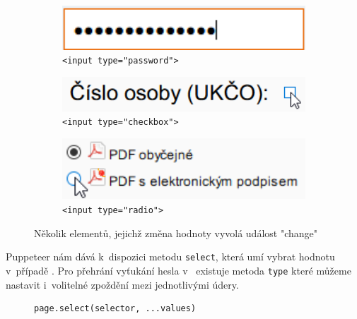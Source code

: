\documentclass[12pt, a4paper, twoside]{article}
\begin{document}
\begin{figure}[H]
\begin{minipage}{0.45\textwidth}
		\begin{subfigure}[t]{1.0\textwidth}
			\includegraphics[width=1\textwidth]{passwordChange.png}
			\caption{\foreignlanguage{english}{\texttt{<input type="password">}}}
			\vspace{0.3cm}
			\label{subfig:passwordChange}
		\end{subfigure}	
	\vspace{0.3cm}
	\begin{subfigure}{1.0\textwidth}
		\includegraphics[width=1\textwidth]{checkboxChange.png}
		\caption{\foreignlanguage{english}{\texttt{<input type="checkbox">}}}
		\label{subfig:checkboxChange}
	\end{subfigure}	
	\begin{subfigure}{1.0\textwidth}
		\includegraphics[width=1\textwidth]{radioChange.png}
		\caption{\foreignlanguage{english}{\texttt{<input type="radio">}}}
		\label{subfig:radioChange}
	\end{subfigure}
	\end{minipage}
	\caption{Několik elementů, jejichž změna hodnoty vyvolá událost "change"}
	\end{figure}
	Puppeteer nám dává k~dispozici metodu \texttt{select}, která umí vybrat hodnotu v~případě . Pro přehrání vyťukání hesla v~ existuje metoda \texttt{type} které můžeme nastavit i~volitelné zpoždění mezi jednotlivými údery.
	\begin{codefigure}[H]
	\begin{subfigure}[t]{\textwidth}
	\begin{lstlisting}[style=MyJavaScript]
page.select(selector, ...values)
	\end{lstlisting}
	\caption{}
	\end{subfigure}	
	\end{codefigure}
\end{document}
